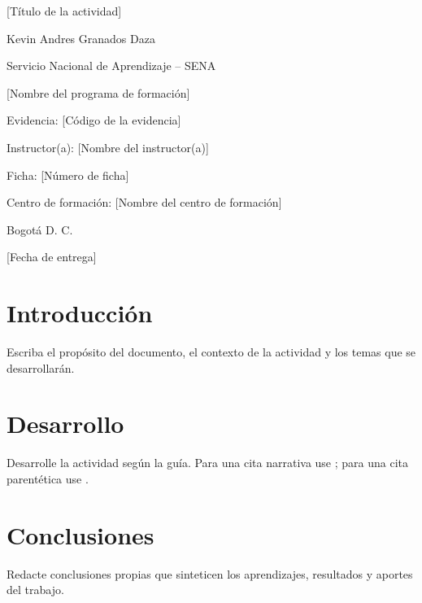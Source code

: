 \documentclass[12pt,letterpaper]{article}
\newcommand{\institucion}{Servicio Nacional de Aprendizaje -- SENA}
\newcommand{\programa}{[Nombre del programa de formación]}
\newcommand{\tituloTrabajo}{[Título de la actividad]}
\newcommand{\codigoEvidencia}{[Código de la evidencia]}
\newcommand{\aprendiz}{Kevin Andres Granados Daza}
\newcommand{\instructor}{[Nombre del instructor(a)]}
\newcommand{\ficha}{[Número de ficha]}
\newcommand{\centro}{[Nombre del centro de formación]}
\newcommand{\ciudad}{Bogotá D. C.}
\newcommand{\fechaEntrega}{[Fecha de entrega]}
\begin{document}
\begin{titlepage}
  \centering
  \vspace*{2.5cm}
  {\Large \tituloTrabajo\par}
  \vfill
  {\large \aprendiz\par}
  \vspace{1.5cm}
  {\large \institucion\par}
  {\large \programa\par}
  \vspace{1cm}
  {\large Evidencia: \codigoEvidencia\par}
  \vspace{1cm}
  {\large Instructor(a): \instructor\par}
  {\large Ficha: \ficha\par}
  {\large Centro de formación: \centro\par}
  \vfill
  {\large \ciudad\par}
  {\large \fechaEntrega\par}
\end{titlepage}

\section{Introducción}
Escriba el propósito del documento, el contexto de la actividad y los temas que se desarrollarán.

\section{Desarrollo}
Desarrolle la actividad según la guía. Para una cita narrativa use \textcite{ejemploLibro}; para una cita parentética use \parencite{ejemploLibro}.

\section{Conclusiones}
Redacte conclusiones propias que sinteticen los aprendizajes, resultados y aportes del trabajo.

\printbibliography[title={Referencias}]
\end{document}

